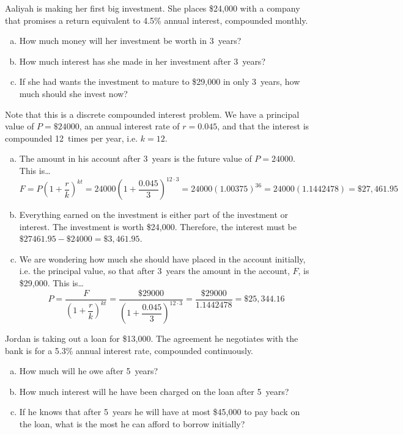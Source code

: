 \documentclass[11pt,letterpaper]{article}
\begin{document}

 Aaliyah is making her first big investment. She places \$24,000 with a company that promises a return equivalent to 4.5\% annual interest, compounded monthly.
	\begin{enumerate}[(a)]
	\item How much money will her investment be worth in 3~years?
	\item How much interest has she made in her investment after 3~years?
	\item If she had wants the investment to mature to \$29,000 in only 3~years, how much should she invest now?
	\end{enumerate} \pspace

\sol Note that this is a discrete compounded interest problem. We have a principal value of $P= \$24000$, an annual interest rate of $r= 0.045$, and that the interest is compounded 12~times per year, i.e. $k= 12$. 
\begin{enumerate}[(a)]
\item The amount in his account after 3~years is the future value of $P= 24000$. This is\dots
	\[
	F= P \left(1 + \dfrac{r}{k} \right)^{kt}= 24000 \left(1 + \dfrac{0.045}{3} \right)^{12 \cdot 3}= 24000 (1.00375)^{36}= 24000 (1.1442478)= \$27,461.95
	\] \pspace

\item Everything earned on the investment is either part of the investment or interest. The investment is worth \$24,000. Therefore, the interest must be $\$27461.95 - \$24000= \$3,461.95$. \pspace

\item We are wondering how much she should have placed in the account initially, i.e. the principal value, so that after 3~years the amount in the account, $F$, is \$29,000. This is\dots
	\[
	P= \dfrac{F}{\left(1 + \dfrac{r}{k} \right)^{kt}}= \dfrac{\$29000}{\left(1 + \dfrac{0.045}{3} \right)^{12 \cdot 3}}= \dfrac{\$29000}{1.1442478}= \$25,344.16
	\]
\end{enumerate}



\newpage



 Jordan is taking out a loan for \$13,000. The agreement he negotiates with the bank is for a 5.3\% annual interest rate, compounded continuously. 
	\begin{enumerate}[(a)]
	\item How much will he owe after 5~years?
	\item How much interest will he have been charged on the loan after 5~years?
	\item If he knows that after 5~years he will have at most \$45,000 to pay back on the loan, what is the most he can afford to borrow initially? 
	\end{enumerate} \pspace
\end{document}
